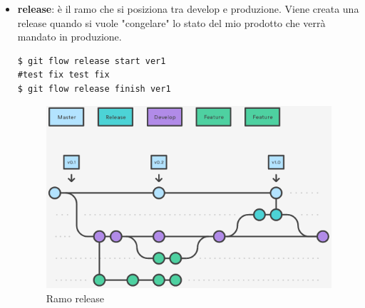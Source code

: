 \begin{itemize}
    \item \textbf{release}: è il ramo che si posiziona tra develop e produzione. Viene creata una release quando si vuole "congelare" lo stato del mio prodotto che verrà mandato in produzione.
    \begin{verbatim}
$ git flow release start ver1
#test fix test fix
$ git flow release finish ver1
    \end{verbatim}
    \begin{figure}[H]
    	\begin{center}
        	 \includegraphics[scale=0.55]{img/release.png}
        	 \caption{Ramo release}
     	\end{center}
    \end{figure}
    

\end{itemize}
